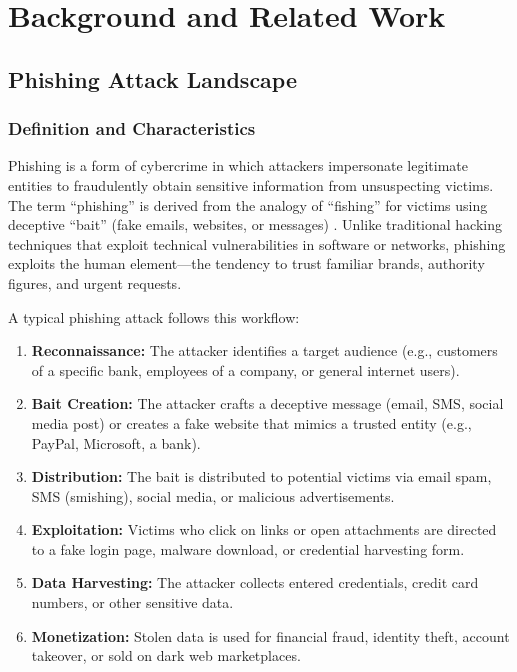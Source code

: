 \section{Background and Related Work}
\label{chapter-2-background-and-related-work}

\subsection{Phishing Attack Landscape}\label{phishing-attack-landscape}

\subsubsection{Definition and
Characteristics}\label{definition-and-characteristics}

Phishing is a form of cybercrime in which attackers impersonate
legitimate entities to fraudulently obtain sensitive information from
unsuspecting victims. The term ``phishing'' is derived from the analogy
of ``fishing'' for victims using deceptive ``bait'' (fake emails,
websites, or messages) \cite{hong2012}. Unlike traditional hacking techniques
that exploit technical vulnerabilities in software or networks, phishing
exploits the human element---the tendency to trust familiar brands,
authority figures, and urgent requests.

A typical phishing attack follows this workflow:

\begin{enumerate}

\item
  \textbf{Reconnaissance:} The attacker identifies a target audience
  (e.g., customers of a specific bank, employees of a company, or
  general internet users).
\item
  \textbf{Bait Creation:} The attacker crafts a deceptive message
  (email, SMS, social media post) or creates a fake website that mimics
  a trusted entity (e.g., PayPal, Microsoft, a bank).
\item
  \textbf{Distribution:} The bait is distributed to potential victims
  via email spam, SMS (smishing), social media, or malicious
  advertisements.
\item
  \textbf{Exploitation:} Victims who click on links or open attachments
  are directed to a fake login page, malware download, or credential
  harvesting form.
\item
  \textbf{Data Harvesting:} The attacker collects entered credentials,
  credit card numbers, or other sensitive data.
\item
  \textbf{Monetization:} Stolen data is used for financial fraud,
  identity theft, account takeover, or sold on dark web marketplaces.
\end{enumerate}

